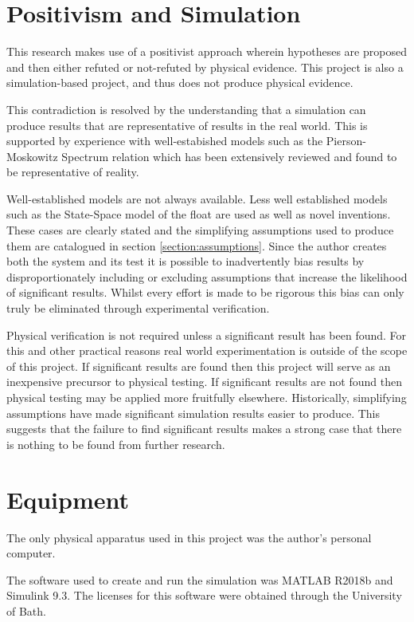 \documentclass{report}
\begin{document}
\section{Positivism and Simulation}
This research makes use of a positivist approach wherein hypotheses are proposed and then either refuted or not-refuted by physical evidence. This project is also a simulation-based project, and thus does not produce physical evidence.

This contradiction is resolved by the understanding that a simulation can produce results that are representative of results in the real world. This is supported by experience with well-estabished models such as the Pierson-Moskowitz Spectrum relation\cite{OGPM} which has been extensively reviewed\cite{PMReview} and found to be representative of reality. 

Well-established models are not always available. Less well established models such as the State-Space model of the float \cite{andyMPC} are used as well as novel inventions. These cases are clearly stated and the simplifying assumptions used to produce them are catalogued in section \ref{section:assumptions}. Since the author creates both the system and its test it is possible to inadvertently bias results by disproportionately including or excluding assumptions that increase the likelihood of significant results. Whilst every effort is made to be rigorous this bias can only truly be eliminated through experimental verification.

Physical verification is not required unless a significant result has been found. For this and other practical reasons real world experimentation is outside of the scope of this project. If significant results are found then this project will serve as an inexpensive precursor to physical testing. If significant results are not found then physical testing may be applied more fruitfully elsewhere. Historically, simplifying assumptions have made significant simulation results easier to produce\cite{PMReview}. This suggests that the failure to find significant results makes a strong case that there is nothing to be found from further research.

\section{Equipment}
The only physical apparatus used in this project was the author's personal computer.

The software used to create and run the simulation was MATLAB R2018b and Simulink 9.3. The licenses for this software were obtained through the University of Bath.
\end{document}
